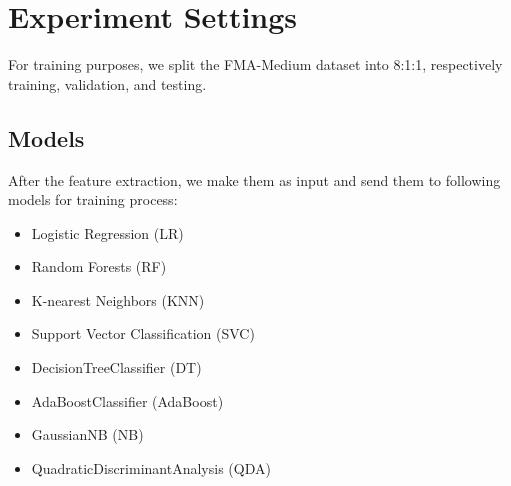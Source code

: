 \section{Experiment Settings}

For training purposes, we split the FMA-Medium dataset into 8:1:1, respectively training, validation, and testing.

\subsection{Models}
After the feature extraction, we make them as input and send them to following models for training process:
\begin{itemize}
    \item Logistic Regression (LR)
    \item Random Forests (RF)
    \item K-nearest Neighbors (KNN)
    \item Support Vector Classification (SVC)
    \item DecisionTreeClassifier (DT)
    \item AdaBoostClassifier (AdaBoost)
    \item GaussianNB (NB)
    \item QuadraticDiscriminantAnalysis (QDA)
\end{itemize}
